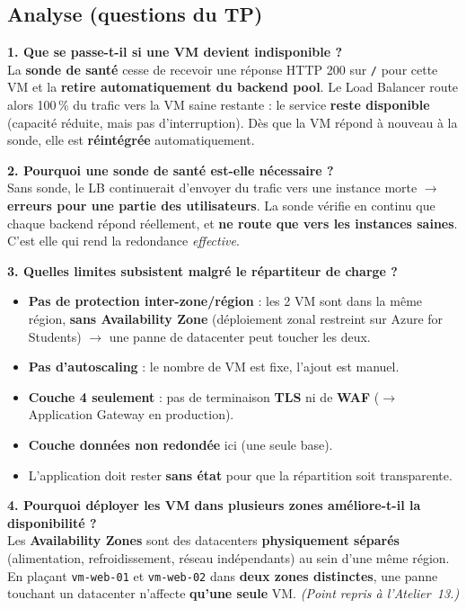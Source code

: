 \documentclass[11pt,a4paper]{article}
\begin{document}
\subsection{Analyse (questions du TP)}
\textbf{1. Que se passe-t-il si une VM devient indisponible ?}\\
La \textbf{sonde de santé} cesse de recevoir une réponse HTTP 200 sur \texttt{/} pour cette VM et la
\textbf{retire automatiquement du backend pool}. Le Load Balancer route alors 100\,\% du trafic vers la VM
saine restante : le service \textbf{reste disponible} (capacité réduite, mais pas d'interruption). Dès que
la VM répond à nouveau à la sonde, elle est \textbf{réintégrée} automatiquement.

\smallskip\textbf{2. Pourquoi une sonde de santé est-elle nécessaire ?}\\
Sans sonde, le LB continuerait d'envoyer du trafic vers une instance morte $\rightarrow$ \textbf{erreurs
pour une partie des utilisateurs}. La sonde vérifie en continu que chaque backend répond réellement, et
\textbf{ne route que vers les instances saines}. C'est elle qui rend la redondance \textit{effective}.

\smallskip\textbf{3. Quelles limites subsistent malgré le répartiteur de charge ?}
\begin{itemize}
  \item \textbf{Pas de protection inter-zone/région} : les 2 VM sont dans la même région, \textbf{sans Availability Zone} (déploiement zonal restreint sur Azure for Students) $\rightarrow$ une panne de datacenter peut toucher les deux.
  \item \textbf{Pas d'autoscaling} : le nombre de VM est fixe, l'ajout est manuel.
  \item \textbf{Couche 4 seulement} : pas de terminaison \textbf{TLS} ni de \textbf{WAF} ($\rightarrow$ Application Gateway en production).
  \item \textbf{Couche données non redondée} ici (une seule base).
  \item L'application doit rester \textbf{sans état} pour que la répartition soit transparente.
\end{itemize}

\smallskip\textbf{4. Pourquoi déployer les VM dans plusieurs zones améliore-t-il la disponibilité ?}\\
Les \textbf{Availability Zones} sont des datacenters \textbf{physiquement séparés} (alimentation,
refroidissement, réseau indépendants) au sein d'une même région. En plaçant \texttt{vm-web-01} et
\texttt{vm-web-02} dans \textbf{deux zones distinctes}, une panne touchant un datacenter n'affecte
\textbf{qu'une seule} VM. \textit{(Point repris à l'Atelier~13.)}
\end{document}
